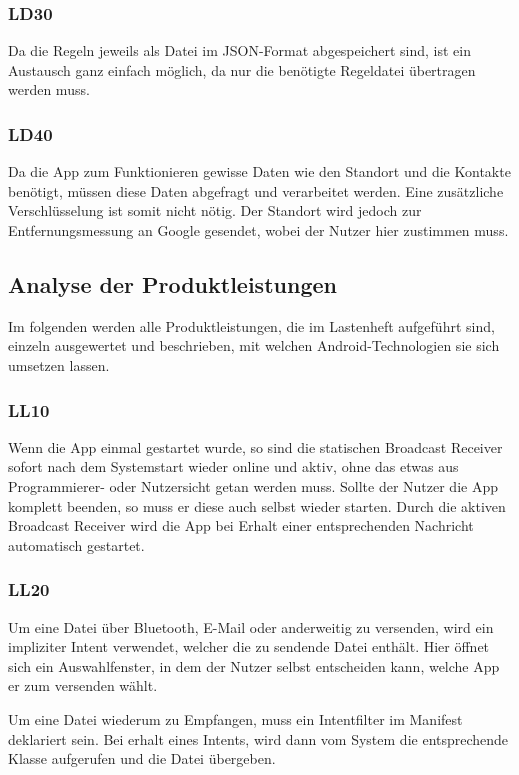 \subsubsection{LD30}
Da die Regeln jeweils als Datei im JSON-Format abgespeichert sind, ist ein Austausch ganz einfach m\"oglich, da nur die ben\"otigte Regeldatei \"ubertragen werden muss.

\subsubsection{LD40}
Da die App zum Funktionieren gewisse Daten wie den Standort und die Kontakte ben\"otigt, m\"ussen diese Daten abgefragt und verarbeitet werden. Eine zus\"atzliche Verschl\"usselung ist somit nicht n\"otig. Der Standort wird jedoch zur Entfernungsmessung an Google gesendet, wobei der Nutzer hier zustimmen muss.


\subsection{Analyse der Produktleistungen}
Im folgenden werden alle Produktleistungen, die im Lastenheft aufgef\"uhrt sind, einzeln ausgewertet und beschrieben, mit welchen Android-Technologien sie sich umsetzen lassen.

\subsubsection{LL10}
Wenn die App einmal gestartet wurde, so sind die statischen Broadcast Receiver sofort nach dem Systemstart wieder online und aktiv, ohne das etwas aus Programmierer- oder Nutzersicht getan werden muss. Sollte der Nutzer die App komplett beenden, so muss er diese auch selbst wieder starten.
Durch die aktiven Broadcast Receiver wird die App bei Erhalt einer entsprechenden Nachricht automatisch gestartet.

\subsubsection{LL20}
Um eine Datei \"uber Bluetooth, E-Mail oder anderweitig zu versenden, wird ein impliziter Intent verwendet, welcher die zu sendende Datei enth\"alt. Hier \"offnet sich ein Auswahlfenster, in dem der Nutzer selbst entscheiden kann, welche App er zum versenden w\"ahlt. 

Um eine Datei wiederum zu Empfangen, muss ein Intentfilter im Manifest deklariert sein. Bei erhalt eines Intents, wird dann vom System die entsprechende Klasse aufgerufen und die Datei \"ubergeben.